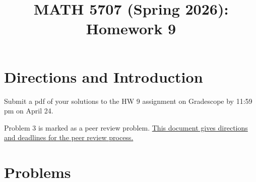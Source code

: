 \documentclass[12pt]{article}
\title{MATH 5707 (Spring 2026): Homework 9}
\date{}
\begin{document}
\vspace{-0.7in}

\maketitle
\vspace{-0.6in}


\section*{Directions and Introduction}
Submit a pdf of your solutions to the HW 9 assignment on Gradescope by 11:59 pm on April 24.

Problem 3 is marked as a peer review problem. \href{https://docs.google.com/document/d/1jSw9pmMJJFUx_6dTkcUi4k4HJNIrrIIgs9zdWhAycx0/edit?usp=sharing}{This document gives directions and deadlines for the peer review process.}



\section*{Problems}
\end{document}
